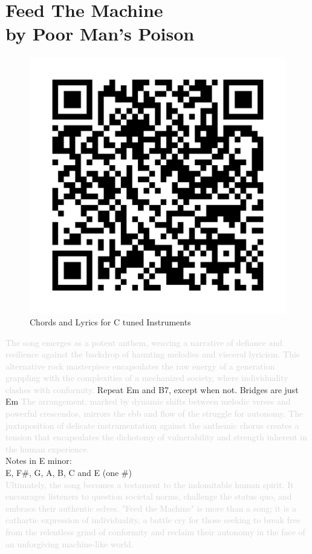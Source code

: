 \chapter[Feed The Machine]{Feed The Machine\\[1ex]\large{by Poor Man's Poison}}

\begin{figure}
\includegraphics[width=1\linewidth]{QR_Codes/QR_FeedTheMachine.png}\\
Chords and Lyrics for C tuned Instruments
\end{figure}

\textcolor{lightgray}{The song  emerges as a potent anthem, weaving a narrative of defiance and resilience against the backdrop of haunting melodies and visceral lyricism. This alternative rock masterpiece encapsulates the raw energy of a generation grappling with the complexities of a mechanized society, where individuality clashes with conformity.} Repeat Em and B7, except when not. Bridges are just Em
\textcolor{lightgray}{The arrangement, marked by dynamic shifts between melodic verses and powerful crescendos, mirrors the ebb and flow of the struggle for autonomy. The juxtaposition of delicate instrumentation against the anthemic chorus creates a tension that encapsulates the dichotomy of vulnerability and strength inherent in the human experience.}\\

Notes in E minor:\\

E, F\#, G, A, B, C and E (one \#)\\

\textcolor{lightgray}{Ultimately, the song becomes a testament to the indomitable human spirit. It encourages listeners to question societal norms, challenge the status quo, and embrace their authentic selves. "Feed the Machine" is more than a song; it is a cathartic expression of individuality, a battle cry for those seeking to break free from the relentless grind of conformity and reclaim their autonomy in the face of an unforgiving machine-like world.}
